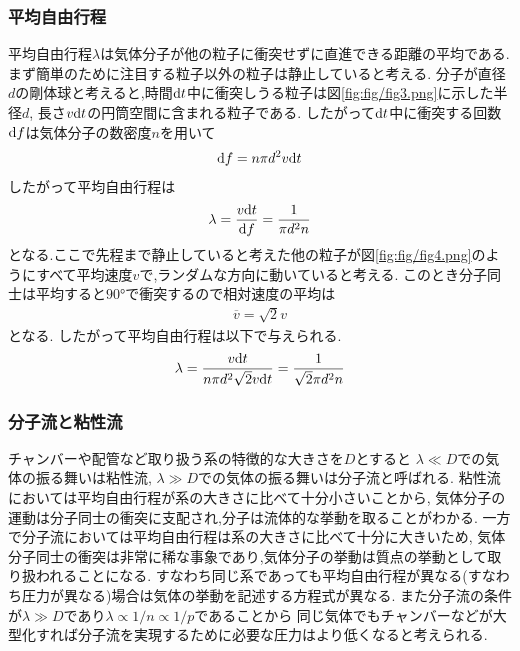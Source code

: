 \subsubsection{平均自由行程}
平均自由行程$\lambda$は気体分子が他の粒子に衝突せずに直進できる距離の平均である.
まず簡単のために注目する粒子以外の粒子は静止していると考える.
分子が直径$d$の剛体球と考えると,時間${\rm d}t$中に衝突しうる粒子は図\ref{fig:fig/fig3.png}に示した半径$d$,
長さ$v{\rm d}t$の円筒空間に含まれる粒子である.
したがって${\rm d}t$中に衝突する回数${\rm d}f$は気体分子の数密度$n$を用いて
\begin{align}
  {\rm d}f=n\pi d^2 v{\rm d}t
\end{align}
したがって平均自由行程は
\begin{align}
  \lambda=\frac{v{\rm d}t}{{\rm d}f}=\frac{1}{\pi d^2 n}
\end{align}
となる.ここで先程まで静止していると考えた他の粒子が図\ref{fig:fig/fig4.png}のようにすべて平均速度$v$で,ランダムな方向に動いていると考える.
このとき分子同士は平均すると$90\si{\degree}$で衝突するので相対速度の平均は
\begin{align}
  \overline{v}=\sqrt{2}v
\end{align}
となる.\cite{yamasaki:online}
したがって平均自由行程は以下で与えられる.
\begin{align}
  \lambda=\frac{v{\rm d}t}{n\pi d^2 \sqrt{2}v{\rm d}t}=\frac{1}{\sqrt{2}\pi d^2 n}
\end{align}
\begin{figure}[htbp]
  \centering
  \begin{minipage}[b]{0.45\linewidth}
    \centering
  \end{minipage}
  \begin{minipage}[b]{0.45\linewidth}
    \centering
  \end{minipage}
\end{figure}
\subsubsection{分子流と粘性流}
チャンバーや配管など取り扱う系の特徴的な大きさを$D$とすると
$\lambda\ll D$での気体の振る舞いは粘性流,
$\lambda\gg D$での気体の振る舞いは分子流と呼ばれる.
粘性流においては平均自由行程が系の大きさに比べて十分小さいことから,
気体分子の運動は分子同士の衝突に支配され,分子は流体的な挙動を取ることがわかる.
一方で分子流においては平均自由行程は系の大きさに比べて十分に大きいため,
気体分子同士の衝突は非常に稀な事象であり,気体分子の挙動は質点の挙動として取り扱われることになる.
すなわち同じ系であっても平均自由行程が異なる(すなわち圧力が異なる)場合は気体の挙動を記述する方程式が異なる.
また分子流の条件が$\lambda\gg D$であり$\lambda\propto 1/n\propto 1/p$であることから
同じ気体でもチャンバーなどが大型化すれば分子流を実現するために必要な圧力はより低くなると考えられる.